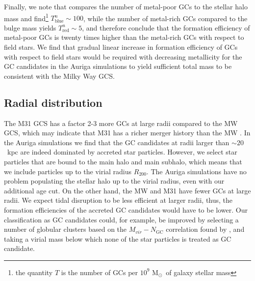 \documentclass[a4paper,fleqn,usenatbib]{mnras}
\newcommand{\Sun}[0]{\ensuremath{_{\odot}}}
\begin{document}
Finally, we note that \citet{2006ARA&A..44..193B} compares the number of metal-poor 
GCs to the stellar halo mass and find\footnote{the quantity $T$ is the number of 
GCs per $10^9$ M\Sun \, of galaxy stellar mass} $T^n_{\text{blue}} \sim 100$, 
while the number of metal-rich GCs compared to the bulge mass yields 
$T^n_{\text{red}} \sim 5$, and therefore conclude that the formation efficiency
of metal-poor GCs is twenty times higher than the metal-rich GCs with respect to 
field stars. We find that gradual linear increase in formation efficiency of GCs
with respect to field stars would be required with decreasing metallicity for
the GC candidates in the Auriga simulations to yield sufficient total mass to
be consistent with the Milky Way GCS.

\subsection{Radial distribution}
\label{sec:discussion_Rgc}
The M31 GCS has a factor 2-3 more GCs at large radii compared to the MW GCS,
which may indicate that M31 has a richer merger history than the MW 
\citep{2016ApJ...824...42C}. In the Auriga simulations we find that the GC 
candidates at radii larger than ${\sim}20$~kpc are indeed dominated by accreted
star particles. However, we select star particles that are bound to the main 
halo and main subhalo, which means that we include particles up to the virial 
radius $R_{200}$. The Auriga simulations have no problem populating the stellar 
halo up to the virial radius, even with our additional age cut. On the other hand, 
the MW and M31 have fewer GCs at large radii. We expect tidal disruption to be
less efficient at larger radii, thus, the formation efficiencies of the accreted 
GC candidates would have to be lower. Our classification as GC candidates could, 
for example, be improved by selecting a number of globular clusters based on the 
$M_{vir}-N_{\text{GC}}$ correlation found by \citet{2019arXiv190100900B}, and 
taking a virial mass below which none of the star particles is treated as GC candidate.

\end{document}
